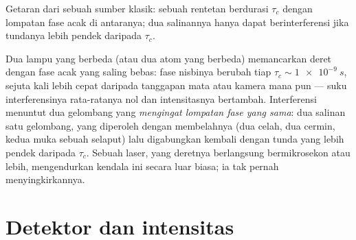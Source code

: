 \begin{omfigure}

{\small Getaran dari sebuah sumber klasik: sebuah rentetan  berdurasi $\tau_c$ dengan lompatan fase acak di antaranya; dua
salinannya hanya dapat berinterferensi jika tundanya lebih pendek daripada $\tau_c$.}
\end{omfigure}

\begin{remark}\label{rem:b2:scalar-light-model:twosources}
Dua lampu yang berbeda (atau dua atom yang berbeda) memancarkan deret dengan
fase acak yang saling bebas: fase nisbinya berubah tiap $\tau_c
\sim \qty{1e-9}{s}$, sejuta kali lebih cepat daripada tanggapan mata atau kamera
mana pun --- suku interferensinya rata-ratanya nol dan
intensitasnya bertambah. Interferensi menuntut dua gelombang yang \emph{mengingat
lompatan fase yang sama}: dua salinan satu gelombang, yang diperoleh dengan membelahnya
(dua celah, dua cermin, kedua muka sebuah selaput) lalu digabungkan kembali dengan
tunda yang lebih pendek daripada $\tau_c$. Sebuah laser, yang deretnya berlangsung bermikrosekon atau
lebih, mengendurkan kendala ini secara luar biasa; ia tak pernah menyingkirkannya.
\end{remark}

\section{Detektor dan intensitas}

